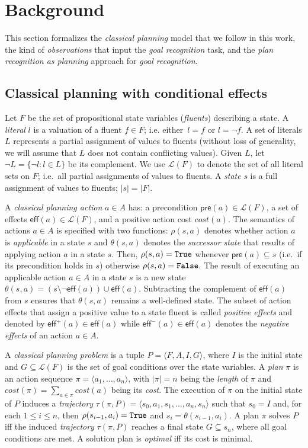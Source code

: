 \documentclass{article}
\newcommand{\tup}[1]{{\langle #1 \rangle}}
\newcommand{\pre}{\mathsf{pre}}     %
\newcommand{\eff}{\mathsf{eff}}     %
\begin{document}
\section{Background}
\label{sec:background}
This section formalizes the {\em classical planning} model that we follow in this work, the kind of {\em observations} that input the {\em goal recognition} task, and the {\em plan recognition as planning} approach for {\em goal recognition}.  

\subsection{Classical planning with conditional effects}
Let $F$ be the set of  propositional state variables ({\em fluents}) describing a state. A {\em literal} $l$ is a valuation of a fluent $f\in F$; i.e. either~$l=f$ or $l=\neg f$. A set of literals $L$ represents a partial assignment of values to fluents (without loss of generality, we will assume that $L$ does not contain conflicting values). Given $L$, let $\neg L=\{\neg l:l\in L\}$ be its complement. We use $\mathcal{L}(F)$ to denote the set of all literal sets on $F$; i.e.~all partial assignments of values to fluents. A {\em state} $s$ is a full assignment of values to fluents; $|s|=|F|$.

A {\em classical planning action} $a\in A$ has: a precondition $\pre(a)\in\mathcal{L}(F)$, a set of effects $\eff(a)\in\mathcal{L}(F)$, and a positive action cost $cost(a)$. The semantics of actions $a\in A$ is specified with two functions: $\rho(s,a)$ denotes whether action $a$ is {\em applicable} in a state $s$ and $\theta(s,a)$ denotes the {\em successor state} that results of applying action $a$ in a state $s$. Then, $\rho(s,a)={\tt\small True}$ whenever $\pre(a)\subseteq s$ (i.e.~if its precondition holds in $s$) otherwise $\rho(s,a)={\tt\small False}$. The result of executing an applicable action $a\in A$ in a state $s$ is a new state $\theta(s,a)=(s\setminus \neg\eff(a))\cup\eff(a)$. Subtracting the complement of $\eff(a)$ from $s$ ensures that $\theta(s,a)$ remains a well-defined state. The subset of action effects that assign a positive value to a state fluent is called {\em positive effects} and denoted by $\eff^+(a)\in \eff(a)$ while $\eff^-(a)\in \eff(a)$ denotes the {\em negative effects} of an action $a\in A$.

A {\em classical planning problem} is a tuple $P=\tup{F,A,I,G}$, where $I$ is the initial state and $G\subseteq\mathcal{L}(F)$ is the set of goal conditions over the state variables. A {\em plan} $\pi$ is an action sequence $\pi=\tup{a_1, \ldots, a_n}$, with $|\pi|=n$ being the {\em length} of $\pi$ and $cost(\pi)=\sum_{a\in\pi} cost(a)$ being its {\em cost}. The execution of $\pi$ on the initial state of $P$ induces a {\em trajectory} $\tau(\pi,P)=\tup{s_0, a_1, s_1, \ldots, a_n, s_n}$ such that $s_0=I$ and, for each {\small $1\leq i\leq n$}, then $\rho(s_{i-1},a_i)={\tt\small True}$ and $s_i=\theta(s_{i-1},a_i)$. A plan $\pi$ solves $P$ iff the induced {\em trajectory} $\tau(\pi,P)$ reaches a final state $G \subseteq s_n$, where all goal conditions are met. A solution plan is {\em optimal} iff its cost is minimal.
\end{document}
